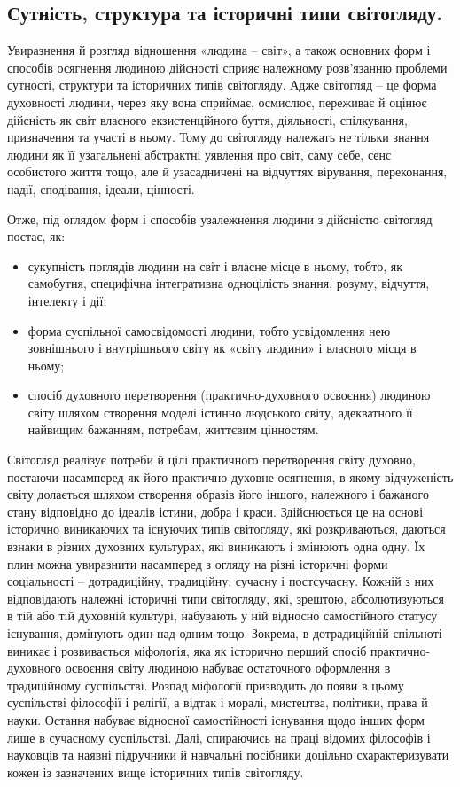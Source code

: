 \subsection{Сутність, структура та історичні типи світогляду.} Увиразнення й
розгляд відношення «людина – світ», а також основних форм і способів
осягнення людиною дійсності сприяє належному розв’язанню проблеми
сутності, структури та історичних типів світогляду. Адже світогляд – це форма
духовності людини, через яку вона сприймає, осмислює, переживає й оцінює
дійсність як світ власного екзистенційного буття, діяльності, спілкування,
призначення та участі в ньому. Тому до світогляду належать не тільки знання
людини як її узагальнені абстрактні уявлення про світ, саму себе, сенс
особистого життя тощо, але й узасадничені на відчуттях вірування,
переконання, надії, сподівання, ідеали, цінності.

Отже, під оглядом форм і способів узалежнення людини з дійсністю
світогляд постає, як:
\begin{itemize}
	\item сукупність поглядів людини на світ і власне місце в ньому, тобто, як
	самобутня, специфічна інтегративна одноцілість знання, розуму, відчуття,
	інтелекту і дії;
	
	\item форма суспільної самосвідомості людини, тобто усвідомлення нею
	зовнішнього і внутрішнього світу як «світу людини» і власного місця в ньому;
	
	\item спосіб духовного перетворення (практично-духовного освоєння) людиною
	світу шляхом створення моделі істинно людського світу, адекватного її
	найвищим бажанням, потребам, життєвим цінностям.
\end{itemize}

Світогляд реалізує потреби й цілі практичного перетворення світу духовно,
постаючи насамперед як його практично-духовне осягнення, в якому
відчуженість світу долається шляхом створення образів його іншого, належного
і бажаного стану відповідно до ідеалів істини, добра і краси. Здійснюється це на
основі історично виникаючих та існуючих типів світогляду, які розкриваються,
даються взнаки в різних духовних культурах, які виникають і змінюють одна
одну. Їх плин можна увиразнити насамперед з огляду на різні історичні форми
соціальності – дотрадиційну, традиційну, сучасну і постсучасну. Кожній з них
відповідають належні історичні типи світогляду, які, зрештою,
абсолютизуються в тій або тій духовній культурі, набувають у ній відносно
самостійного статусу існування, домінують один над одним тощо. Зокрема, в
дотрадиційній спільноті виникає і розвивається міфологія, яка як історично
перший спосіб практично-духовного освоєння світу людиною набуває
остаточного оформлення в традиційному суспільстві. Розпад міфології
призводить до появи в цьому суспільстві філософії і релігії, а відтак і моралі,
мистецтва, політики, права й науки. Остання набуває відносної самостійності
існування щодо інших форм лише в сучасному суспільстві. Далі, спираючись на
праці відомих філософів і науковців та наявні підручники й навчальні
посібники доцільно схарактеризувати кожен із зазначених вище історичних
типів світогляду.

